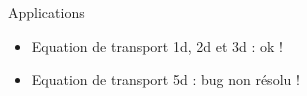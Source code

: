 \begin{frame}{Applications}
\begin{itemize}
\item Equation de transport 1d, 2d et 3d : ok !
\begin{figure}[htb]
  \centering
\end{figure}

\item Equation de transport 5d : {\Huge{\danger}} bug non résolu !
\end{itemize}
\end{frame}

